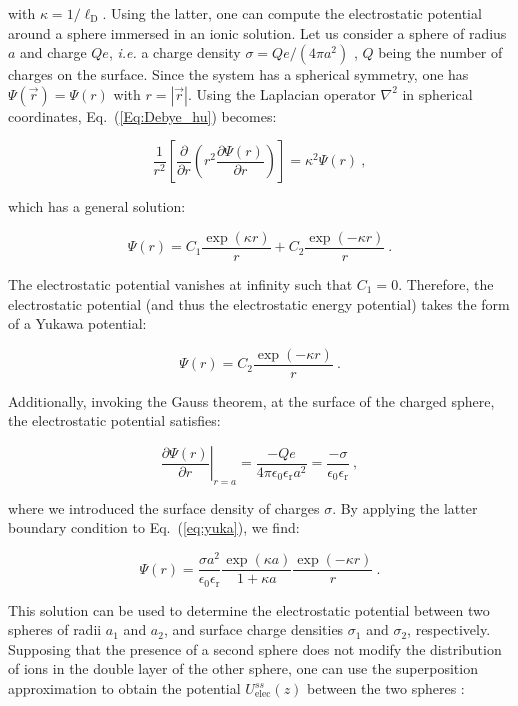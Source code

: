 with $\kappa = 1/\ell _\mathrm{D}$. Using the latter, one can compute the electrostatic potential around a sphere immersed in an ionic solution. Let us consider a sphere of radius $a$ and charge $Qe$, \textit{i.e.} a charge density $\sigma = Qe/(4\pi a^2)$ , $Q$ being the number of charges on the surface. Since the system has a spherical symmetry, one has $\Psi (\vec{r}) = \Psi(r)$ with $r = |\vec{r}|$. Using the Laplacian operator $\nabla ^2$ in spherical coordinates, Eq.~(\ref{Eq:Debye_hu}) becomes:

\begin{equation}
	\frac{1}{r^2}\left[\frac{\partial}{\partial r} \left(r^2 \frac{\partial \Psi(r)}{\partial r}\right)\right] = \kappa^2  \Psi (r) ~,
\end{equation}

which has a general solution:

\begin{equation}
	\Psi(r) = C_1 \frac{\exp(\kappa r)}{r} + C_2 \frac{\exp(-\kappa r)}{r}~.
\end{equation}

The electrostatic potential vanishes at infinity such that $C_1 = 0$. Therefore, the electrostatic potential (and thus the electrostatic energy potential) takes the form of a Yukawa potential:

\begin{equation}
	\Psi (r) = C_2 \frac{\exp(-\kappa r)}{r} ~.
	\label{eq:yuka}
\end{equation}

Additionally, invoking the Gauss theorem, at the surface of the charged sphere, the electrostatic potential satisfies:

\begin{equation}
	\left. \frac{\partial{\Psi (r)}}{\partial r} \right|_{r=a} = \frac{-Qe}{4 \pi \epsilon_0 \epsilon_\mathrm{r} a^2}  = \frac{-\sigma}{\epsilon_0 \epsilon_\mathrm{r}} ~,
\end{equation}

where we introduced the surface density of charges $\sigma$. By applying the latter boundary condition to Eq.~(\ref{eq:yuka}), we find:

\begin{equation}
	\Psi (r) = \frac{\sigma a^2}{\epsilon_0 \epsilon_\mathrm{r}} \frac{\exp (\kappa a)}{1 + \kappa a} \frac{\exp (-\kappa r)}{r} ~.
\end{equation}

This solution can be used to determine the electrostatic potential between two spheres of radii $a_1$ and $a_2$, and surface charge densities $\sigma_1$ and $\sigma_2$, respectively. Supposing that the presence of a second sphere does not modify the distribution of ions in the double layer of the other sphere, one can use the superposition approximation to obtain the potential $U_\textrm{elec} ^{ss} (z)$ between the two spheres \cite{bell_approximate_1970}:

